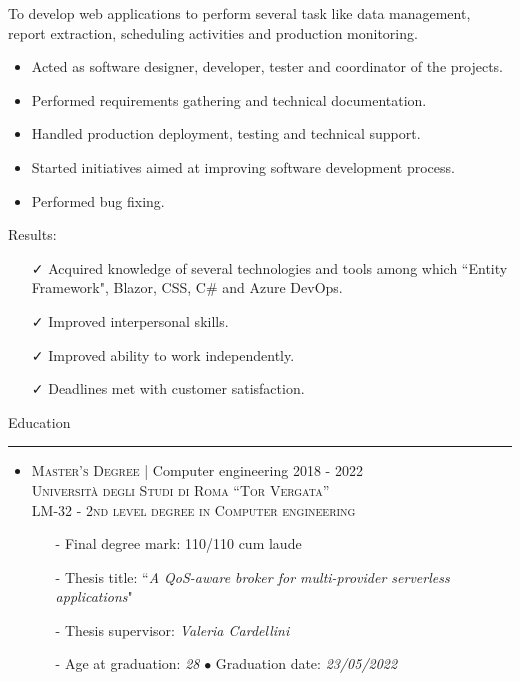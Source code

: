 \documentclass[english,10pt,a4paper]{article}
\newcommand{\CompanyName}[1]{\textsc{{\small #1}}}
\newcommand{\JobTimeRange}[1]{{\footnotesize \textcolor{CvColor!50}{\faCalendar*} \hspace{0.01cm} #1}}
\newcommand{\CvBullet}{\hspace{0.05cm} \textcolor{CvColor}{$\bullet$} \hspace{0.05cm}}
\newcommand{\CvCheck}{\textcolor{CvColor}{\faCheck}}
\newcommand{\CvSection}[2]{
	\hspace{0.25cm}\textcolor{CvColor!50}{#1} \hspace{0.01cm} \textcolor{CvColor!80}{#2}\\
	\textcolor{CvColor}{\rule[.7\baselineskip]{\textwidth}{1pt}}}
\begin{document}
\begin{paracol}{2}
\begin{tcolorbox}[colback=white, height=\textheight, colframe=white, left=0cm]
\begin{itemize}
{\begin{itemize}
					To develop web applications to perform several task like data management, report extraction, scheduling activities and production monitoring.
					\begin{itemize}
						\item Acted as software designer, developer, tester and coordinator of the projects.
						\item Performed requirements gathering and technical documentation.
						\item Handled production deployment, testing and technical support.
						\item Started initiatives aimed at improving software development process.
						\item Performed bug fixing.
					\end{itemize}
					\textcolor{CvColor}{Results:}
					\begin{itemize}
						\item[\CvCheck] Acquired knowledge of several technologies and tools among which ``Entity Framework", Blazor, CSS, C\# and Azure DevOps.
						\item[\CvCheck] Improved interpersonal skills.
						\item[\CvCheck] Improved ability to work independently.
						\item[\CvCheck] Deadlines met with customer satisfaction. 
					\end{itemize}						
				\end{itemize}
			}
		
		
		
		
	\end{itemize}
	
\CvSection{\faGraduationCap}{Education}
\begin{itemize}
	\item \CompanyName{Master’s Degree} \textcolor{CvColor}{|} {\scriptsize Computer engineering} \hfill \JobTimeRange{2018 - 2022}\\
	{\scriptsize \textcolor{CvIcon}{\textsc{Università degli Studi di Roma ``Tor Vergata''}}} \\
	{\scriptsize \textcolor{CvIcon}{\textsc{LM-32 - 2nd level degree in Computer engineering}}}
	{\scriptsize \begin{itemize}
		\item[-] Final degree mark: \textcolor{CvColor}{110/110 cum laude}
		\item[-] Thesis title: ``\textit{A QoS-aware broker for multi-provider serverless applications}"
		\item[-] Thesis supervisor: \textit{Valeria Cardellini}
		\item[-] Age at graduation: \textit{28} \CvBullet Graduation date: \textit{23/05/2022}	
	\end{itemize}}
	

\end{itemize}
\end{tcolorbox}
\end{paracol}
\end{document}
